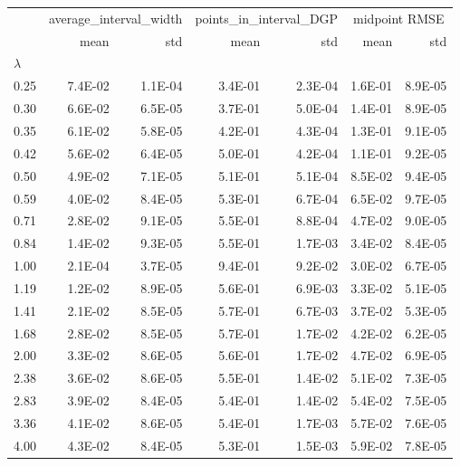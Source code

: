 \begin{tabular}{lrrrrrr}
 & \multicolumn{2}{c}{average_interval_width} & \multicolumn{2}{c}{points_in_interval_DGP} & \multicolumn{2}{c}{midpoint RMSE} \\
 & mean & std & mean & std & mean & std \\
$\lambda$ &  &  &  &  &  &  \\
0.25 & 7.4E-02 & 1.1E-04 & 3.4E-01 & 2.3E-04 & 1.6E-01 & 8.9E-05 \\
0.30 & 6.6E-02 & 6.5E-05 & 3.7E-01 & 5.0E-04 & 1.4E-01 & 8.9E-05 \\
0.35 & 6.1E-02 & 5.8E-05 & 4.2E-01 & 4.3E-04 & 1.3E-01 & 9.1E-05 \\
0.42 & 5.6E-02 & 6.4E-05 & 5.0E-01 & 4.2E-04 & 1.1E-01 & 9.2E-05 \\
0.50 & 4.9E-02 & 7.1E-05 & 5.1E-01 & 5.1E-04 & 8.5E-02 & 9.4E-05 \\
0.59 & 4.0E-02 & 8.4E-05 & 5.3E-01 & 6.7E-04 & 6.5E-02 & 9.7E-05 \\
0.71 & 2.8E-02 & 9.1E-05 & 5.5E-01 & 8.8E-04 & 4.7E-02 & 9.0E-05 \\
0.84 & 1.4E-02 & 9.3E-05 & 5.5E-01 & 1.7E-03 & 3.4E-02 & 8.4E-05 \\
1.00 & 2.1E-04 & 3.7E-05 & 9.4E-01 & 9.2E-02 & 3.0E-02 & 6.7E-05 \\
1.19 & 1.2E-02 & 8.9E-05 & 5.6E-01 & 6.9E-03 & 3.3E-02 & 5.1E-05 \\
1.41 & 2.1E-02 & 8.5E-05 & 5.7E-01 & 6.7E-03 & 3.7E-02 & 5.3E-05 \\
1.68 & 2.8E-02 & 8.5E-05 & 5.7E-01 & 1.7E-02 & 4.2E-02 & 6.2E-05 \\
2.00 & 3.3E-02 & 8.6E-05 & 5.6E-01 & 1.7E-02 & 4.7E-02 & 6.9E-05 \\
2.38 & 3.6E-02 & 8.6E-05 & 5.5E-01 & 1.4E-02 & 5.1E-02 & 7.3E-05 \\
2.83 & 3.9E-02 & 8.4E-05 & 5.4E-01 & 1.4E-02 & 5.4E-02 & 7.5E-05 \\
3.36 & 4.1E-02 & 8.6E-05 & 5.4E-01 & 1.7E-03 & 5.7E-02 & 7.6E-05 \\
4.00 & 4.3E-02 & 8.4E-05 & 5.3E-01 & 1.5E-03 & 5.9E-02 & 7.8E-05 \\
\end{tabular}
